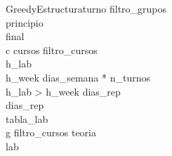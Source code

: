 \begin{pseudocode}{GreedyEstructura}{turno}
    \label{greedyestructura}
    filtro\_grupos \GETS {}\\
    principio \GETS {}\\
    final \GETS {}\\
    \FOREACH c \in cursos \DO
    \BEGIN
        filtro\_cursos \GETS {}\\
        h\_lab \GETS {}\\
        h\_week \GETS dias\_semana * n\_turnos\\

        \IF h\_lab > h\_week \THEN
   	    	dias\_rep \GETS {}\\
        \ELSE 
          dias\_rep \GETS \emptyset\\

       	tabla\_lab \GETS {}\\

       	\FOREACH g \in filtro\_cursos \DO
       	\BEGIN
       		teoria \GETS {}\\
       		lab \GETS {}\\


\end{pseudocode}

